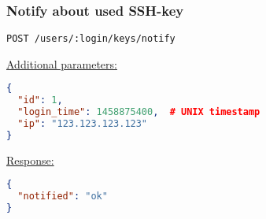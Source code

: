 %
%
%
%
%
%
%


\subsubsection{Notify about used SSH-key}

\begin{lstlisting}[language=http_request]
POST /users/:login/keys/notify
\end{lstlisting}

{\tiny \underline{Additional parameters:}}
\begin{lstlisting}[language=json, numbers=none]
{
  "id": 1,
  "login_time": 1458875400,  # UNIX timestamp
  "ip": "123.123.123.123"
}
\end{lstlisting}


{\tiny \underline{Response:}}
\begin{lstlisting}[language=json, numbers=none]
{
  "notified": "ok"
}
\end{lstlisting}
